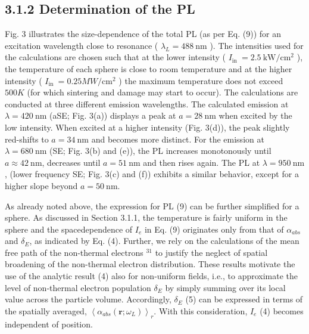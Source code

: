 \documentclass[10pt]{article}
\begin{document}
\subsection*{3.1.2 Determination of the PL}
Fig. 3 illustrates the size-dependence of the total PL (as per Eq. (9)) for an excitation wavelength close to resonance ( $\lambda_{L}=488 \mathrm{~nm}$ ). The intensities used for the calculations are chosen such that at the lower intensity ( $I_{\text {in }}=2.5 \mathrm{~kW} / \mathrm{cm}^{2}$ ), the temperature of each sphere is close to room temperature and at the higher intensity ( $I_{\text {in }}=0.25 M W / \mathrm{cm}^{2}$ ) the maximum temperature does not exceed $500 K$ (for which sintering and damage may start to occur). The calculations are conducted at three different emission wavelengths. The calculated emission at $\lambda=420 \mathrm{~nm}$ (aSE; Fig. 3(a)) displays a peak at $a=28 \mathrm{~nm}$ when excited by the low intensity. When excited at a higher intensity (Fig. 3(d)), the peak slightly red-shifts to $a=34 \mathrm{~nm}$ and becomes more distinct. For the emission at $\lambda=680 \mathrm{~nm}$ (SE; Fig. 3(b) and (e)), the PL increases monotonously until $a \approx 42 \mathrm{~nm}$, decreases until $a=51 \mathrm{~nm}$ and then rises again. The PL at $\lambda=950 \mathrm{~nm}$, (lower frequency SE; Fig. 3(c) and (f)) exhibits a similar behavior, except for a higher slope beyond $a=50 \mathrm{~nm}$.

As already noted above, the expression for PL (9) can be further simplified for a sphere. As discussed in Section 3.1.1, the temperature is fairly uniform in the sphere and the spacedependence of $I_{e}$ in Eq. (9) originates only from that of $\alpha_{a b s}$ and $\delta_{E}$, as indicated by Eq. (4). Further, we rely on the calculations of the mean free path of the non-thermal electrons ${ }^{31}$ to justify the neglect of spatial broadening of the non-thermal electron distribution. These results motivate the use of the analytic result (4) also for non-uniform fields, i.e., to approximate the level of non-thermal electron population $\delta_{E}$ by simply summing over its local value across the particle volume. Accordingly, $\delta_{E}$ (5) can be expressed in terms of the spatially averaged, $\left\langle\alpha_{a b s}\left(\mathbf{r} ; \omega_{L}\right)\right\rangle_{r}$. With this consideration, $I_{e}$ (4) becomes independent of position.
\end{document}
